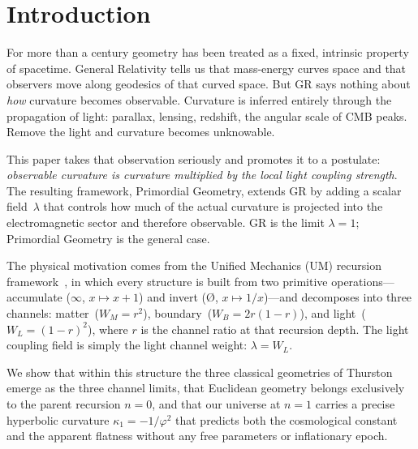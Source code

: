 \documentclass[prd,twocolumn,preprintnumbers,amsmath,amssymb]{revtex4-2}
\newcommand{\phig}{\varphi}
\newcommand{\WL}{W_{L}}
\newcommand{\WB}{W_{B}}
\newcommand{\WM}{W_{M}}
\begin{document}
\maketitle

\section{Introduction}
\label{sec:intro}

For more than a century geometry has been treated as a fixed, intrinsic property
of spacetime.  General Relativity tells us that mass-energy curves space and that
observers move along geodesics of that curved space.  But GR says nothing about
\emph{how} curvature becomes observable.  Curvature is inferred entirely through
the propagation of light: parallax, lensing, redshift, the angular scale of CMB
peaks.  Remove the light and curvature becomes unknowable.

This paper takes that observation seriously and promotes it to a postulate:
\emph{observable curvature is curvature multiplied by the local light coupling
strength}.  The resulting framework, Primordial Geometry, extends GR by adding a
scalar field~$\lambda$ that controls how much of the actual curvature is
projected into the electromagnetic sector and therefore observable.  GR is the
limit $\lambda=1$; Primordial Geometry is the general case.

The physical motivation comes from the Unified Mechanics (UM) recursion
framework~\cite{Shields2026um,Shields2026parent}, in which every structure is
built from two primitive operations---accumulate ($\infty$, $x\mapsto x+1$) and
invert ($\text{\O}$, $x\mapsto 1/x$)---and decomposes into three
channels: matter~($\WM = r^2$), boundary~($\WB = 2r(1-r)$),
and light~($\WL = (1-r)^2$), where $r$ is the channel ratio at that recursion
depth.  The light coupling field is simply the light channel weight: $\lambda =
\WL$.

We show that within this structure the three classical geometries of
Thurston~\cite{Thurston1997} emerge as the three channel limits, that Euclidean
geometry belongs exclusively to the parent recursion $n=0$, and that our
universe at $n=1$ carries a precise hyperbolic curvature $\kappa_1 = -1/\phig^2$
that predicts both the cosmological constant and the apparent flatness without
any free parameters or inflationary epoch.
\end{document}
